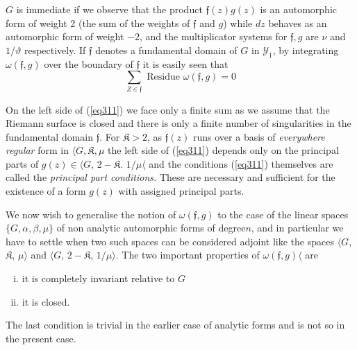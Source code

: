 $G$ is immediate if we observe that the product $\mathfrak{f} (z) g
(z)$ is an automorphic form of weight 2 (the sum of the weights of
$\mathfrak{f}$ and $g$) while $dz$ behaves as an automorphic
form of weight $- 2$, and the multiplicator systems for $\mathfrak{f},
g $ are $\nu$ and $1/\vartheta$ respectively. If $\mathfrak{f}$
denotes a fundamental domain of $G$ in $\mathscr{Y}_1$, by integrating
$\omega (\mathfrak{f}, g)$ over the boundary of $\mathfrak{f}$ it is
easily seen that  
\begin{equation*}
\sum_{Z \in \mathfrak{f}} \text { Residue } \omega (\mathfrak{f}, g ) =
0 \tag{311}\label{eq311} 
\end{equation*}

On the left side of (\ref{eq311}) we face only a finite sum as we assume
that the Riemann surface is closed and there is only a finite number
of singularities in the fundamental domain $\mathfrak{f}$. For
$\mathfrak{K} > 2$, as $\mathfrak{f}(z)$ runs over a basis of \textit {
  everywhere regular } form in $\langle G, \mathfrak{K}, \mu$ the left
side of (\ref{eq311}) depends only on the principal parts of $g (z) \in
\langle G$, $2-\mathfrak{K}$. $1/\mu  \langle$  and the conditions (\ref{eq311})
themselves are called the \textit{principal part conditions.} These
are necessary and sufficient for the existence of a form $g (z)$ with
assigned principal parts.  

We now wish to generalise the notion of $\omega (\mathfrak{f}, g)$ to
the case of the linear spaces $\{ G, \alpha, \beta, \mu\}$ of non
analytic automorphic forms of degree\pageoriginale $n$, and in
particular we have to settle when two such spaces can be considered
adjoint like the spaces $\langle G$, $\mathfrak{K}$, $\mu \rangle$ and
$\langle G$, $2-\mathfrak{K}$, $1/\mu \rangle$. The two important
properties of $\omega (\mathfrak{f}, g ) \langle$ are   
\begin{enumerate}[(i)]
\item it is completely invariant relative to $G$

\item it is closed. 
\end{enumerate}

The last condition is trivial in the earlier case of analytic forms
and is not so in the present case. 

